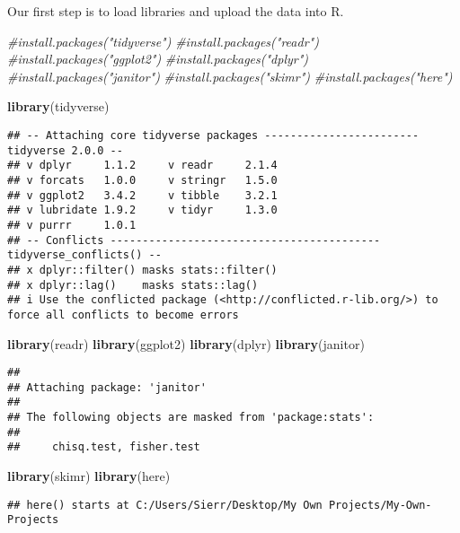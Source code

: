 \documentclass[
]{article}
\newenvironment{Shaded}{\begin{snugshade}}{\end{snugshade}}
\newcommand{\CommentTok}[1]{\textcolor[rgb]{0.56,0.35,0.01}{\textit{#1}}}
\newcommand{\FunctionTok}[1]{\textcolor[rgb]{0.13,0.29,0.53}{\textbf{#1}}}
\newcommand{\NormalTok}[1]{#1}
\begin{document}
Our first step is to load libraries and upload the data into R.

\begin{Shaded}
\begin{Highlighting}[]
\CommentTok{\#install.packages("tidyverse")}
\CommentTok{\#install.packages("readr")}
\CommentTok{\#install.packages("ggplot2")}
\CommentTok{\#install.packages("dplyr")}
\CommentTok{\#install.packages("janitor")}
\CommentTok{\#install.packages("skimr")}
\CommentTok{\#install.packages("here")}

\FunctionTok{library}\NormalTok{(tidyverse)}
\end{Highlighting}
\end{Shaded}

\begin{verbatim}
## -- Attaching core tidyverse packages ------------------------ tidyverse 2.0.0 --
## v dplyr     1.1.2     v readr     2.1.4
## v forcats   1.0.0     v stringr   1.5.0
## v ggplot2   3.4.2     v tibble    3.2.1
## v lubridate 1.9.2     v tidyr     1.3.0
## v purrr     1.0.1     
## -- Conflicts ------------------------------------------ tidyverse_conflicts() --
## x dplyr::filter() masks stats::filter()
## x dplyr::lag()    masks stats::lag()
## i Use the conflicted package (<http://conflicted.r-lib.org/>) to force all conflicts to become errors
\end{verbatim}

\begin{Shaded}
\begin{Highlighting}[]
\FunctionTok{library}\NormalTok{(readr)}
\FunctionTok{library}\NormalTok{(ggplot2)}
\FunctionTok{library}\NormalTok{(dplyr)}
\FunctionTok{library}\NormalTok{(janitor)}
\end{Highlighting}
\end{Shaded}

\begin{verbatim}
## 
## Attaching package: 'janitor'
## 
## The following objects are masked from 'package:stats':
## 
##     chisq.test, fisher.test
\end{verbatim}

\begin{Shaded}
\begin{Highlighting}[]
\FunctionTok{library}\NormalTok{(skimr)}
\FunctionTok{library}\NormalTok{(here)}
\end{Highlighting}
\end{Shaded}

\begin{verbatim}
## here() starts at C:/Users/Sierr/Desktop/My Own Projects/My-Own-Projects
\end{verbatim}
\end{document}
